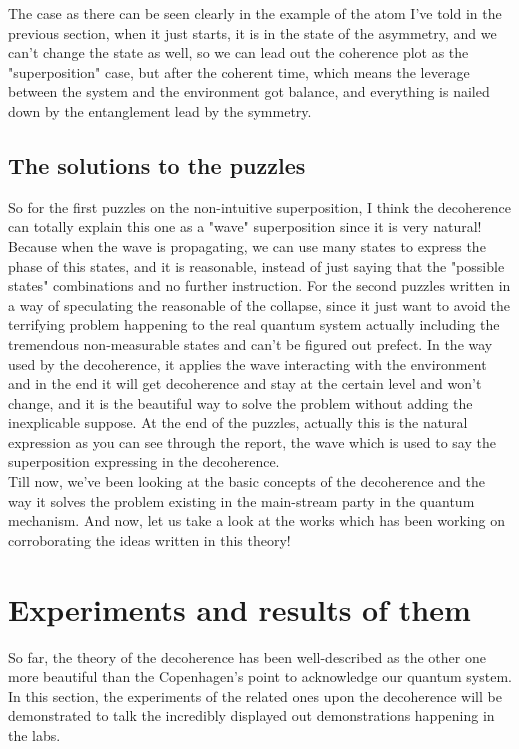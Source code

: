 \documentclass[final,1p,12pt]{elsarticle}
\begin{document}
The case as there can be seen clearly in the example of the atom I've told in the previous section, when it just starts, it is in the state of the asymmetry, and we can't change the state as well, so we can lead out the coherence plot as the "superposition" case, but after the coherent time, which means the leverage between the system and the environment got balance, and everything is nailed down by the entanglement lead by the symmetry.\\

\subsection{The solutions to the puzzles}
So for the first puzzles on the non-intuitive superposition, I think the decoherence can totally explain this one as a "wave" superposition since it is very natural! Because when the wave is propagating, we can use many states to express the phase of this states, and it is reasonable, instead of just saying that the "possible states" combinations and no further instruction. For the second puzzles written in a way of speculating the reasonable of the collapse, since it just want to avoid the terrifying problem happening to the real quantum system actually including the tremendous non-measurable states and can't be figured out prefect.  In the way used by the decoherence, it applies the wave interacting with the environment and in the end it will get decoherence and stay at the certain level and won't change, and it is the beautiful way to solve the problem without adding the inexplicable suppose. At the end of the puzzles, actually this is the natural expression as you can see through the report, the wave which is used to say the superposition expressing in the decoherence.\\

Till now, we've been looking at the basic concepts of the decoherence and the way it solves the problem existing in the main-stream party in the quantum mechanism. And now, let us take a look at the works which has been working on corroborating the ideas written in this theory!

\section{Experiments and results of them} 
So far, the theory of the decoherence has been well-described as the other one more beautiful than the Copenhagen's point to acknowledge our quantum system. In this section, the experiments of the related ones upon the decoherence will be demonstrated to talk the incredibly displayed out demonstrations happening in the labs.
\end{document}
